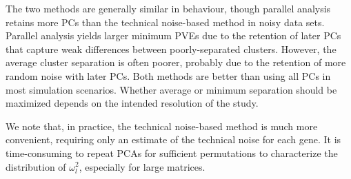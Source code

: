 \documentclass{article}
\begin{document}
The two methods are generally similar in behaviour, though parallel analysis retains more PCs than the technical noise-based method in noisy data sets.
Parallel analysis yields larger minimum PVEs due to the retention of later PCs that capture weak differences between poorly-separated clusters.
However, the average cluster separation is often poorer, probably due to the retention of more random noise with later PCs.
Both methods are better than using all PCs in most simulation scenarios.
Whether average or minimum separation should be maximized depends on the intended resolution of the study.

We note that, in practice, the technical noise-based method is much more convenient, requiring only an estimate of the technical noise for each gene.
It is time-consuming to repeat PCAs for sufficient permutations to characterize the distribution of $\omega^2_l$, especially for large matrices.
\end{document}
